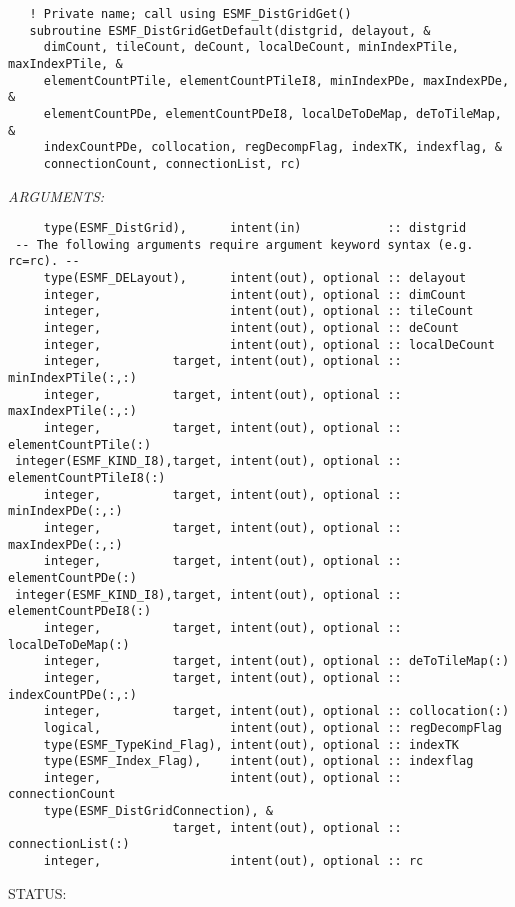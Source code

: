  
\begin{verbatim}   ! Private name; call using ESMF_DistGridGet()
   subroutine ESMF_DistGridGetDefault(distgrid, delayout, &
     dimCount, tileCount, deCount, localDeCount, minIndexPTile, maxIndexPTile, &
     elementCountPTile, elementCountPTileI8, minIndexPDe, maxIndexPDe, &
     elementCountPDe, elementCountPDeI8, localDeToDeMap, deToTileMap, &
     indexCountPDe, collocation, regDecompFlag, indexTK, indexflag, &
     connectionCount, connectionList, rc)\end{verbatim}{\em ARGUMENTS:}
\begin{verbatim}     type(ESMF_DistGrid),      intent(in)            :: distgrid
 -- The following arguments require argument keyword syntax (e.g. rc=rc). --
     type(ESMF_DELayout),      intent(out), optional :: delayout
     integer,                  intent(out), optional :: dimCount
     integer,                  intent(out), optional :: tileCount
     integer,                  intent(out), optional :: deCount
     integer,                  intent(out), optional :: localDeCount
     integer,          target, intent(out), optional :: minIndexPTile(:,:)
     integer,          target, intent(out), optional :: maxIndexPTile(:,:)
     integer,          target, intent(out), optional :: elementCountPTile(:)
 integer(ESMF_KIND_I8),target, intent(out), optional :: elementCountPTileI8(:)
     integer,          target, intent(out), optional :: minIndexPDe(:,:)
     integer,          target, intent(out), optional :: maxIndexPDe(:,:)
     integer,          target, intent(out), optional :: elementCountPDe(:)
 integer(ESMF_KIND_I8),target, intent(out), optional :: elementCountPDeI8(:)
     integer,          target, intent(out), optional :: localDeToDeMap(:)
     integer,          target, intent(out), optional :: deToTileMap(:)
     integer,          target, intent(out), optional :: indexCountPDe(:,:)
     integer,          target, intent(out), optional :: collocation(:)
     logical,                  intent(out), optional :: regDecompFlag
     type(ESMF_TypeKind_Flag), intent(out), optional :: indexTK
     type(ESMF_Index_Flag),    intent(out), optional :: indexflag
     integer,                  intent(out), optional :: connectionCount
     type(ESMF_DistGridConnection), &
                       target, intent(out), optional :: connectionList(:)
     integer,                  intent(out), optional :: rc
           \end{verbatim}
{\sf STATUS:}
